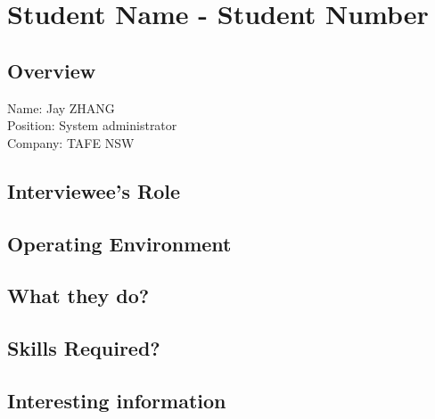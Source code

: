 \chapter{Student Name - Student Number}

\section{Overview}
\noindent Name: Jay ZHANG
\\
Position: System administrator
\\
Company: TAFE NSW

\section{Interviewee's Role}

\section{Operating Environment}

\section{What they do?}

\section{Skills Required?}

\section{Interesting information}
